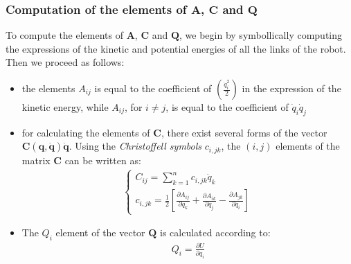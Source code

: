 \documentclass[a4paper,10pt]{article}
\begin{document}
\subsubsection{Computation of the elements of $\mathbf{A}$, $\mathbf{C}$ and $\mathbf{Q}$}
To compute the elements of $\mathbf{A}$, $\mathbf{C}$ and $\mathbf{Q}$, we begin by symbollically computing the 
expressions of the kinetic and potential energies of all the links of the robot. Then we proceed as follows:
\begin{itemize}
  \item the elements $A_{ij}$ is equal to the coefficient of $\left(\frac{\dot{q}_i^2}{2}\right)$ in the expression of
  the kinetic energy, while $A_{ij}$, for $i \neq j$, is equal to the coefficient of $\dot{q}_i\dot{q}_j$
  \item for calculating the elements of $\mathbf{C}$, there exist several forms of the vector $\mathbf{C(q,\dot{q})\dot{q}}$.
 Using the \textit{Christoffell symbols} $c_{i,jk}$, the $(i,j)$ elements of the matrix $\mathbf{C}$ can be written as:
 \begin{align}
  \begin{cases}
   C_{ij} = \sum\limits^{n}_{k=1}c_{i,jk}\dot{q}_k \\
   c_{i,jk} = \frac{1}{2}\left[\frac{\partial A_{ij}}{\partial q_k} + \frac{\partial A_{ik}}{\partial q_j} - \frac{\partial A_{jk}}{\partial q_i}\right]
  \end{cases} \label{eqC}
 \end{align}
 \item The $Q_i$ element of the vector $\mathbf{Q}$ is calculated according to:
 \begin{align}
  Q_i = \frac{\partial U}{\partial q_i}
 \end{align}
\end{itemize}
\end{document}
